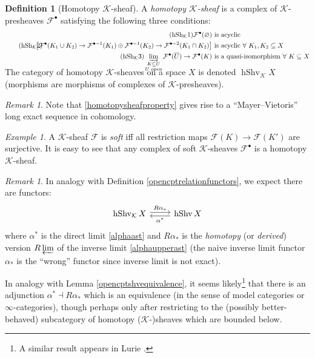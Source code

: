 \documentclass[12pt]{article}
\theoremstyle{definition}
\newtheorem{definition}[theorem]{Definition}
\theoremstyle{remark}
\newtheorem{remark}[theorem]{Remark}
\newtheorem{example}[theorem]{Example}
\numberwithin{equation}{subsection}
\newcommand{\F}{\mathcal F}
\newcommand{\K}{\mathcal K}
\newcommand{\hShv}{\operatorname{hShv}}
\begin{document}
\begin{definition}[Homotopy $\K$-sheaf]\label{homotopyKsheaf}
A \emph{homotopy $\K$-sheaf} is a complex of $\K$-presheaves $\F^\bullet$ satisfying the following three conditions:
\begin{align*}
\tag{hSh$_\K$1}\label{homotopysheafacyclic}\F^\bullet(\varnothing)&\text{ is acyclic}\\
\tag{hSh$_\K$2}\label{homotopysheafproperty}\hspace{-10pt}\bigl[\F^\bullet(K_1\cup K_2)\to\F^{\bullet-1}(K_1)\oplus\F^{\bullet-1}(K_2)\to\F^{\bullet-2}(K_1\cap K_2)\bigr]&\text{ is acyclic }\forall\text{ }K_1,K_2\subseteq X\\
\tag{hSh$_\K$3}\label{homotopysheafcontinuity}\smash{\varinjlim_{\begin{smallmatrix}K\subseteq U\cr U\textrm{ open}\end{smallmatrix}}}\F^\bullet(\overline U)\to\F^\bullet(K)&\text{ is a quasi-isomorphism }\forall\text{ }K\subseteq X
\end{align*}
The category of homotopy $\K$-sheaves on a space $X$ is denoted $\hShv_\K X$ (morphisms are morphisms of complexes of $\K$-presheaves).
\end{definition}

\begin{remark}
Note that \eqref{homotopysheafproperty} gives rise to a ``Mayer--Vietoris'' long exact sequence in cohomology.
\end{remark}

\begin{example}\label{softhomotopysheafresolution}
A $\K$-sheaf $\F$ is \emph{soft} iff all restriction maps $\F(K)\to\F(K')$ are surjective.  It is easy to see that any complex of soft $\K$-sheaves $\F^\bullet$ is a homotopy $\K$-sheaf.
\end{example}

\begin{remark}\label{homotopyKnotsheavesequivalencermk}
In analogy with Definition \ref{opencptrelationfunctors}, we expect there are functors:
\begin{equation}
\begin{tikzcd}\hShv_\K X\ar[yshift=0.5ex]{r}{R\alpha_\ast}&\ar[yshift=-0.5ex]{l}{\alpha^\ast}\hShv X\end{tikzcd}
\end{equation}
where $\alpha^\ast$ is the direct limit \eqref{alphaast} and $R\alpha_\ast$ is the \emph{homotopy} (or \emph{derived}) version $R\varprojlim$ of the inverse limit \eqref{alphaupperast} (the naive inverse limit functor $\alpha_\ast$ is the ``wrong'' functor since inverse limit is not exact).

In analogy with Lemma \ref{opencptshvequivalence}, it seems likely\footnote{A similar result appears in Lurie \cite[Corollary 7.3.4.10]{luriehtt}.} that there is an adjunction $\alpha^\ast\dashv R\alpha_\ast$ which is an equivalence (in the sense of model categories or $\infty$-categories), though perhaps only after restricting to the (possibly better-behaved) subcategory of homotopy ($\K$-)sheaves which are bounded below.
\end{remark}
\end{document}
